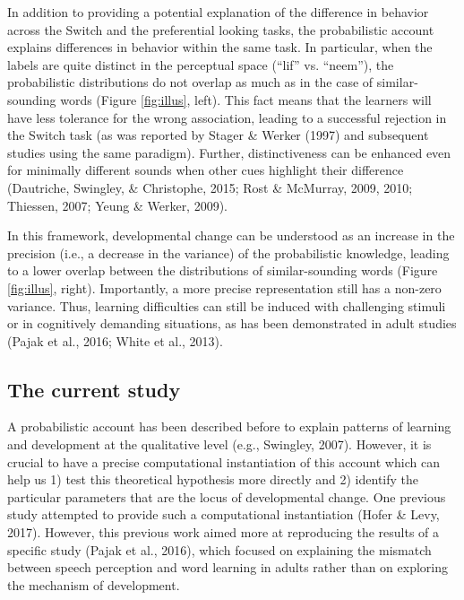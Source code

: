 \documentclass[english,,man]{apa6}
\begin{document}
In addition to providing a potential explanation of the difference in behavior across the Switch and the preferential looking tasks, the probabilistic account explains differences in behavior within the same task. In particular, when the labels are quite distinct in the perceptual space (\enquote{lif} vs. \enquote{neem}), the probabilistic distributions do not overlap as much as in the case of similar-sounding words (Figure \ref{fig:illus}, left). This fact means that the learners will have less tolerance for the wrong association, leading to a successful rejection in the Switch task (as was reported by Stager \& Werker (1997) and subsequent studies using the same paradigm). Further, distinctiveness can be enhanced even for minimally different sounds when other cues highlight their difference (Dautriche, Swingley, \& Christophe, 2015; Rost \& McMurray, 2009, 2010; Thiessen, 2007; Yeung \& Werker, 2009).

In this framework, developmental change can be understood as an increase in the precision (i.e., a decrease in the variance) of the probabilistic knowledge, leading to a lower overlap between the distributions of similar-sounding words (Figure \ref{fig:illus}, right). Importantly, a more precise representation still has a non-zero variance. Thus, learning difficulties can still be induced with challenging stimuli or in cognitively demanding situations, as has been demonstrated in adult studies (Pajak et al., 2016; White et al., 2013).

\hypertarget{the-current-study}{%
\subsection{The current study}\label{the-current-study}}

A probabilistic account has been described before to explain patterns of learning and development at the qualitative level (e.g., Swingley, 2007). However, it is crucial to have a precise computational instantiation of this account which can help us 1) test this theoretical hypothesis more directly and 2) identify the particular parameters that are the locus of developmental change. One previous study attempted to provide such a computational instantiation (Hofer \& Levy, 2017). However, this previous work aimed more at reproducing the results of a specific study (Pajak et al., 2016), which focused on explaining the mismatch between speech perception and word learning in adults rather than on exploring the mechanism of development.
\end{document}
